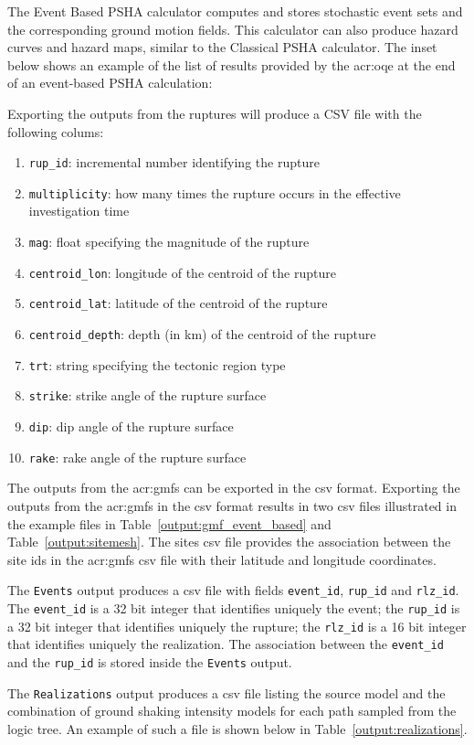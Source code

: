 The Event Based PSHA calculator computes and stores stochastic event sets and
the corresponding ground motion fields. This calculator can also produce
hazard curves and hazard maps, similar to the 
Classical PSHA calculator. The inset below shows an example of the list of
results provided by the \gls{acr:oqe} at the end of an event-based PSHA
calculation:



Exporting the outputs from the ruptures will produce a CSV file with the
following colums:

\begin{enumerate}
\item \texttt{rup\_id}: incremental number identifying the rupture
\item \texttt{multiplicity}: how many times the rupture
occurs in the effective investigation time
\item \texttt{mag}: float specifying the magnitude of the rupture
\item \texttt{centroid\_lon}: longitude of the centroid of the rupture
\item \texttt{centroid\_lat}: latitude of the centroid of the rupture
\item \texttt{centroid\_depth}: depth (in km) of the centroid of the rupture
\item \texttt{trt}: string specifying the tectonic region type
\item \texttt{strike}: strike angle of the rupture surface
\item \texttt{dip}: dip angle of the rupture surface
\item \texttt{rake}: rake angle of the rupture surface
\end{enumerate}

The outputs from the \glspl{acr:gmf} can be exported in the csv
format. Exporting the outputs from the \glspl{acr:gmf} in the 
csv format results in two csv files illustrated in the example files in
Table~\ref{output:gmf_event_based} and Table~\ref{output:sitemesh}. The sites csv
file provides the association between the site ids in the \glspl{acr:gmf} csv
file with their latitude and longitude coordinates.



The \texttt{Events} output produces a csv file with fields \texttt{event\_id},
\texttt{rup\_id} and \texttt{rlz\_id}. The \texttt{event\_id} is a 32 bit
integer that identifies uniquely the event; the \texttt{rup\_id}
is a 32 bit integer that identifies uniquely the rupture; the \texttt{rlz\_id}
is a 16 bit integer that identifies uniquely the
realization. The association between the \texttt{event\_id} and
the  \texttt{rup\_id} is stored inside the \texttt{Events} output.

The \texttt{Realizations} output produces a csv file listing the source model
and the combination of ground shaking intensity models for each path sampled
from the logic tree. An example of such a file is shown below in
Table~\ref{output:realizations}.


